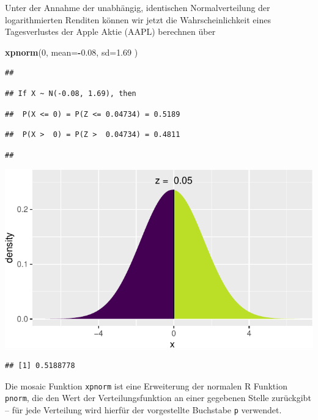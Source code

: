 \documentclass[12pt,ngerman,paper=a4,pagesize,DIV=13]{scrreprt}
\newenvironment{Shaded}{\begin{snugshade}}{\end{snugshade}}
\newcommand{\DataTypeTok}[1]{\textcolor[rgb]{0.13,0.29,0.53}{#1}}
\newcommand{\DecValTok}[1]{\textcolor[rgb]{0.00,0.00,0.81}{#1}}
\newcommand{\FloatTok}[1]{\textcolor[rgb]{0.00,0.00,0.81}{#1}}
\newcommand{\KeywordTok}[1]{\textcolor[rgb]{0.13,0.29,0.53}{\textbf{#1}}}
\newcommand{\NormalTok}[1]{#1}
\newcommand{\OperatorTok}[1]{\textcolor[rgb]{0.81,0.36,0.00}{\textbf{#1}}}
\begin{document}
Unter der Annahme der unabhängig, identischen Normalverteilung der
logarithmierten Renditen können wir jetzt die Wahrscheinlichkeit eines
Tagesverlustes der Apple Aktie (AAPL) berechnen über

\begin{Shaded}
\begin{Highlighting}[]
\KeywordTok{xpnorm}\NormalTok{(}\DecValTok{0}\NormalTok{, }\DataTypeTok{mean=}\OperatorTok{-}\FloatTok{0.08}\NormalTok{, }\DataTypeTok{sd=}\FloatTok{1.69}\NormalTok{ )}
\end{Highlighting}
\end{Shaded}

\begin{verbatim}
## 
\end{verbatim}

\begin{verbatim}
## If X ~ N(-0.08, 1.69), then
\end{verbatim}

\begin{verbatim}
##  P(X <= 0) = P(Z <= 0.04734) = 0.5189
\end{verbatim}

\begin{verbatim}
##  P(X >  0) = P(Z >  0.04734) = 0.4811
\end{verbatim}

\begin{verbatim}
## 
\end{verbatim}

\includegraphics{DatenerhebungStatistik-Uebung_files/figure-latex/unnamed-chunk-92-1.pdf}

\begin{verbatim}
## [1] 0.5188778
\end{verbatim}

Die mosaic Funktion \texttt{xpnorm} ist eine Erweiterung der normalen R
Funktion \texttt{pnorm}, die den Wert der Verteilungsfunktion an einer
gegebenen Stelle zurückgibt -- für jede Verteilung wird hierfür der
vorgestellte Buchstabe \texttt{p} verwendet.
\end{document}
